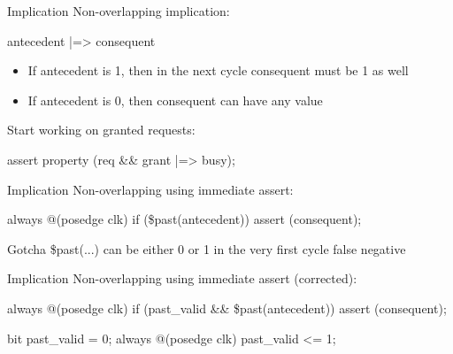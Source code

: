 \documentclass{beamer}
\begin{document}
\begin{frame}{Implication}
Non-overlapping implication:

\begin{semiverbatim}
antecedent |=> consequent
\end{semiverbatim}

\begin{itemize}
 \item If antecedent is 1, then in the next cycle consequent must be 1 as well
 \item If antecedent is 0, then consequent can have any value
\end{itemize}

\pause
Start working on granted requests:
\begin{semiverbatim}
assert property (req \&\& grant |=> busy);
\end{semiverbatim}
\end{frame}


\begin{frame}[fragile]{Implication}
Non-overlapping using immediate assert:

\begin{semiverbatim}
always @(posedge clk)
  if (\$past(antecedent))
    assert (consequent);
\end{semiverbatim}

\pause
\begin{alertblock}{Gotcha}
\$past(...) can be either 0 or 1 in the very first cycle \textrightarrow{} false negative
\end{alertblock}
\end{frame}


\begin{frame}[fragile]{Implication}
Non-overlapping using immediate assert (corrected):

\begin{semiverbatim}
always @(posedge clk)
  if (past_valid \&\& \$past(antecedent))
    assert (consequent);
\end{semiverbatim}

\begin{semiverbatim}
bit past_valid = 0;
always @(posedge clk)
  past_valid <= 1;
\end{semiverbatim}
\end{frame}
\end{document}
